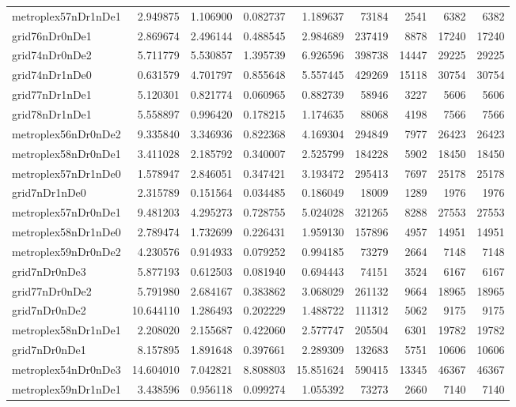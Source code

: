 \begin{longtable}{|l|r|r|r|r|r|r|r|r|}
metroplex57nDr1nDe1 & 2.949875 & 1.106900 & 0.082737 & 1.189637 & 73184 & 2541 & 6382 & 6382 \\
grid76nDr0nDe1 & 2.869674 & 2.496144 & 0.488545 & 2.984689 & 237419 & 8878 & 17240 & 17240 \\
grid74nDr0nDe2 & 5.711779 & 5.530857 & 1.395739 & 6.926596 & 398738 & 14447 & 29225 & 29225 \\
grid74nDr1nDe0 & 0.631579 & 4.701797 & 0.855648 & 5.557445 & 429269 & 15118 & 30754 & 30754 \\
grid77nDr1nDe1 & 5.120301 & 0.821774 & 0.060965 & 0.882739 & 58946 & 3227 & 5606 & 5606 \\
grid78nDr1nDe1 & 5.558897 & 0.996420 & 0.178215 & 1.174635 & 88068 & 4198 & 7566 & 7566 \\
metroplex56nDr0nDe2 & 9.335840 & 3.346936 & 0.822368 & 4.169304 & 294849 & 7977 & 26423 & 26423 \\
metroplex58nDr0nDe1 & 3.411028 & 2.185792 & 0.340007 & 2.525799 & 184228 & 5902 & 18450 & 18450 \\
metroplex57nDr1nDe0 & 1.578947 & 2.846051 & 0.347421 & 3.193472 & 295413 & 7697 & 25178 & 25178 \\
grid7nDr1nDe0 & 2.315789 & 0.151564 & 0.034485 & 0.186049 & 18009 & 1289 & 1976 & 1976 \\
metroplex57nDr0nDe1 & 9.481203 & 4.295273 & 0.728755 & 5.024028 & 321265 & 8288 & 27553 & 27553 \\
metroplex58nDr1nDe0 & 2.789474 & 1.732699 & 0.226431 & 1.959130 & 157896 & 4957 & 14951 & 14951 \\
metroplex59nDr0nDe2 & 4.230576 & 0.914933 & 0.079252 & 0.994185 & 73279 & 2664 & 7148 & 7148 \\
grid7nDr0nDe3 & 5.877193 & 0.612503 & 0.081940 & 0.694443 & 74151 & 3524 & 6167 & 6167 \\
grid77nDr0nDe2 & 5.791980 & 2.684167 & 0.383862 & 3.068029 & 261132 & 9664 & 18965 & 18965 \\
grid7nDr0nDe2 & 10.644110 & 1.286493 & 0.202229 & 1.488722 & 111312 & 5062 & 9175 & 9175 \\
metroplex58nDr1nDe1 & 2.208020 & 2.155687 & 0.422060 & 2.577747 & 205504 & 6301 & 19782 & 19782 \\
grid7nDr0nDe1 & 8.157895 & 1.891648 & 0.397661 & 2.289309 & 132683 & 5751 & 10606 & 10606 \\
metroplex54nDr0nDe3 & 14.604010 & 7.042821 & 8.808803 & 15.851624 & 590415 & 13345 & 46367 & 46367 \\
metroplex59nDr1nDe1 & 3.438596 & 0.956118 & 0.099274 & 1.055392 & 73273 & 2660 & 7140 & 7140 \\

\end{longtable}
